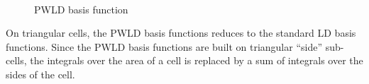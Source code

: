 \begin{figure}[H]
\centering
{}
\\
\caption{PWLD basis function}
\label{pwld}
\end{figure}
On triangular cells, the PWLD basis functions reduces to the standard LD basis 
functions. Since the PWLD basis functions are built on triangular ``side'' 
sub-cells, the integrals over the area of a cell is replaced by a sum of integrals 
over the sides of the cell. 

